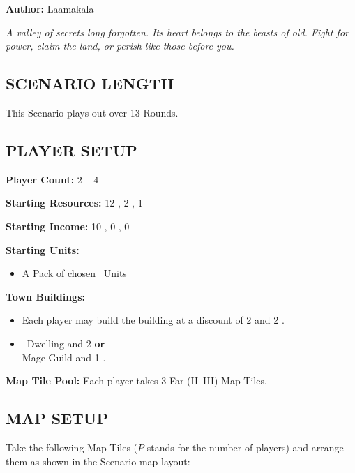 
\begin{multicols*}{2}

\textbf{Author:} Laamakala

\textit{A valley of secrets long forgotten. Its heart belongs to the beasts of old. Fight for power, claim the land, or perish like those before you.}

\subsection*{\MakeUppercase{Scenario Length}}
This Scenario plays out over 13 Rounds.

\subsection*{\MakeUppercase{Player Setup}}
\textbf{Player Count:} 2 -- 4

\textbf{Starting Resources:} 12 , 2 , 1 

\textbf{Starting Income:} 10 , 0 , 0 

\textbf{Starting Units:}

\begin{itemize}
  \item A Pack of chosen \bronze\ Units
\end{itemize}

\textbf{Town Buildings:}
\begin{itemize}
  \item Each player may build the  building at a discount of 2  and 2 .
  \item \bronze\ Dwelling and 2  \textbf{or} \\ Mage Guild and 1 .
\end{itemize}

\textbf{Map Tile Pool:} Each player takes 3 Far (II–III) Map Tiles.

\subsection*{\MakeUppercase{Map Setup}}
Take the following Map Tiles ($P$ stands for the number of players) and arrange them as shown in the Scenario map layout:


\end{multicols*}

